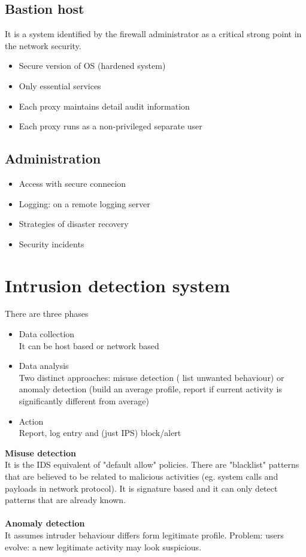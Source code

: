 \documentclass[10pt,a4paper]{book}
\begin{document}
\section{Bastion host}
It is a system identified by the firewall administrator as a critical strong point in the network security.
\begin{itemize}
\item Secure version of OS (hardened system)
\item Only essential services
\item Each proxy maintains detail audit information
\item Each proxy runs as a non-privileged separate user
\end{itemize}
\section{Administration}
\begin{itemize}
\item Access with secure connecion
\item Logging: on a remote logging server
\item Strategies of disaster recovery
\item Security incidents
\end{itemize}
\chapter{Intrusion detection system}
There are three phases
\begin{itemize}
\item Data collection\\
It can be host based or network based
\item Data analysis\\
Two distinct approaches: misuse detection ( list unwanted behaviour) or anomaly detection (build an average profile, report if current activity is significantly different from average)
\item Action\\
Report, log entry and (just IPS) block/alert
\end{itemize}
\textbf{Misuse detection}\\
It is the IDS equivalent of "default allow" policies. There are "blacklist" patterns that are believed to be related to malicious activities (eg. system calls and payloads in network protocol). It is signature based and it can only detect patterns that are already known.\\\\
\textbf{Anomaly detection}\\
It assumes intruder behaviour differs form legitimate profile. Problem: users evolve: a new legitimate activity may look suspicious.
\end{document}
